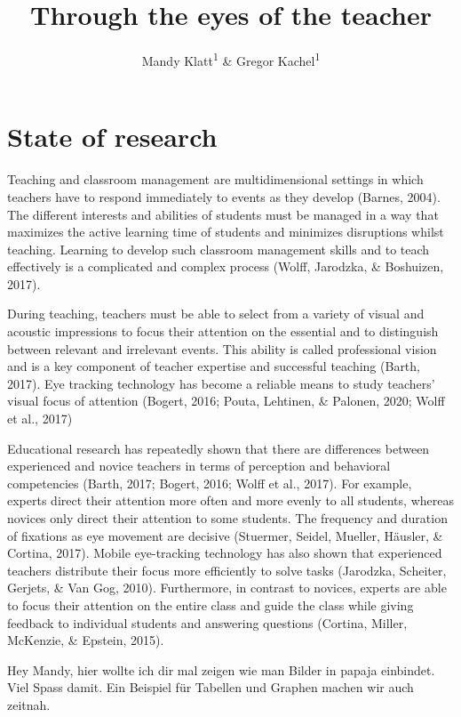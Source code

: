 \documentclass[
  english,
  man,floatsintext]{apa6}
\title{Through the eyes of the teacher}
\author{Mandy Klatt\textsuperscript{1} \& Gregor Kachel\textsuperscript{1}}
\date{}
\affiliation{\vspace{0.5cm}\textsuperscript{1} University of Leipzig}
\begin{document}
\maketitle

\hypertarget{state-of-research}{%
\section{State of research}\label{state-of-research}}

Teaching and classroom management are multidimensional settings in which teachers have to respond immediately to events as they develop (Barnes, 2004). The different interests and abilities of students must be managed in a way that maximizes the active learning time of students and minimizes disruptions whilst teaching. Learning to develop such classroom management skills and to teach effectively is a complicated and complex process (Wolff, Jarodzka, \& Boshuizen, 2017).

During teaching, teachers must be able to select from a variety of visual and acoustic impressions to focus their attention on the essential and to distinguish between relevant and irrelevant events. This ability is called professional vision and is a key component of teacher expertise and successful teaching (Barth, 2017). Eye tracking technology has become a reliable means to study teachers' visual focus of attention (Bogert, 2016; Pouta, Lehtinen, \& Palonen, 2020; Wolff et al., 2017)

Educational research has repeatedly shown that there are differences between experienced and novice teachers in terms of perception and behavioral competencies (Barth, 2017; Bogert, 2016; Wolff et al., 2017). For example, experts direct their attention more often and more evenly to all students, whereas novices only direct their attention to some students. The frequency and duration of fixations as eye movement are decisive (Stuermer, Seidel, Mueller, Häusler, \& Cortina, 2017). Mobile eye-tracking technology has also shown that experienced teachers distribute their focus more efficiently to solve tasks (Jarodzka, Scheiter, Gerjets, \& Van Gog, 2010). Furthermore, in contrast to novices, experts are able to focus their attention on the entire class and guide the class while giving feedback to individual students and answering questions (Cortina, Miller, McKenzie, \& Epstein, 2015).

Hey Mandy, hier wollte ich dir mal zeigen wie man Bilder in papaja einbindet. Viel Spass damit. Ein Beispiel für Tabellen und Graphen machen wir auch zeitnah.
\end{document}
